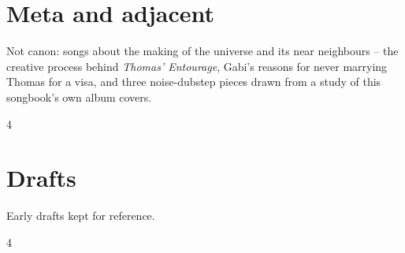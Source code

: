 \documentclass[a4paper,landscape]{memoir}
\begin{document}
\chapter{Meta and adjacent}
Not canon: songs about the making of the universe and its near neighbours -- the creative process behind \emph{Thomas' Entourage}, %
Gabi's reasons for never marrying Thomas for a visa, %
and three noise-dubstep pieces drawn from a study of this songbook's own album covers.
\clearpage\begin{multicols*}{4}








\end{multicols*}

\chapter{Drafts}
Early drafts kept for reference.
\clearpage\begin{multicols*}{4}

\end{multicols*}

\appendix

\backmatter
\printindex[songs]
\clearpage
\printindex[tags]
\end{document}
